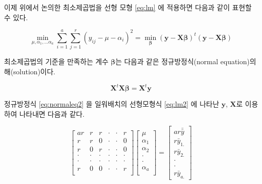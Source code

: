 \documentclass[
  10pt,
]{book}
\theoremstyle{definition}
\theoremstyle{definition}
\theoremstyle{definition}
\theoremstyle{definition}
\theoremstyle{remark}
\begin{document}
이제 위에서 논의한 최소제곱법을 선형 모형 \eqref{eq:lm} 에 적용하면 다음과 같이 표현할 수 있다.

\begin{equation} 
 \min_{\mu, \alpha_1, \dots \alpha_a} \sum_{i=1}^a \sum_{j=1}^r 
(y_{ij} - \mu -\alpha_i)^2 = \min_{\bm \beta } ( \bm y -  \bm X \bm \beta )^t( \bm y -  \bm X \bm \beta ) 
 \label{eq:rsq2}
 \end{equation}

최소제곱법의 기준을 만족하는 계수 \(\bm \beta\)는 다음과 같은 정규방정식(normal equation)의 해(solution)이다.

\begin{equation}
\bm X^t \bm X \bm \beta = \bm X^t \bm y
\label{eq:normaleq2}
\end{equation}

정규방정식 \eqref{eq:normaleq2} 을 일워배치의 선형모형식 \eqref{eq:lm2} 에 나타난 \(\bm y\), \(\bm X\)로 이용하여 나타내면 다음과 같다.

\begin{equation}
\begin{bmatrix}
ar   & r & r & \cdot & \cdot & r \\
r & r &  0  & \cdot & \cdot & 0 \\
r & 0   & r  & \cdot & \cdot & 0 \\
\cdot & \cdot   & \cdot  & \cdot & \cdot & \cdot \\
\cdot & \cdot   & \cdot  & \cdot & \cdot & \cdot \\
r & 0   &  0   & \cdot & \cdot & r \\
\end{bmatrix}
\begin{bmatrix}
\mu \\
\alpha_{1} \\
\alpha_{2} \\
\cdot \\
\cdot \\
\alpha_{a} \\
\end{bmatrix}
=
\begin{bmatrix}
ar \bar {\bar y} \\
r {\bar y}_{1.}\\
r \bar y_{2.}\\
\cdot \\
\cdot \\
r \bar y_{a.}
\end{bmatrix}
\label{eq:normaleq3}
\end{equation}
\end{document}
